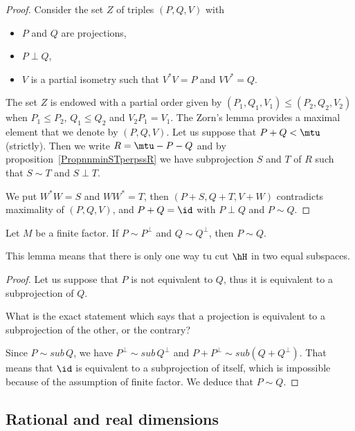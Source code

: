 \begin{proof}
Consider the set \( Z\) of triples \( (P,Q,V)\) with
\begin{itemize}
    \item \( P\) and \( Q\) are projections,
    \item \( P\perp Q\),
    \item
        \( V\) is a partial isometry such that \( V^*V=P\) and \( VV^*=Q\).
\end{itemize}
The set $Z$ is endowed with a partial order given by $(P_1,Q_1,V_1)\leq (P_2,Q_2,V_2)$ when $P_1\leq P_2$, $Q_1\leq Q_2$ and $V_2P_1=V_1$. The Zorn's lemma provides a maximal element that we denote by $(P,Q,V)$. Let us suppose that $P+Q<\mtu$ (strictly). Then we write $R=\mtu-P-Q$ and by proposition~\ref{PropnnminSTperpssR} we have subprojection $S$ and $T$ of $R$ such that $S\sim T$ and $S\perp T$.

We put $W^*W=S$ and $WW^*=T$, then $(P+S,Q+T,V+W)$ contradicts maximality of $(P,Q,V)$, and $P+Q=\id$ with $P\perp Q$ and $P\sim Q$.
\end{proof}

\begin{lemma}		\label{LemfinfacPPQQPsimQ}
Let $M$ be a finite factor. If $P\sim P^{\perp}$ and $Q\sim Q^{\perp}$, then $P\sim Q$.
\end{lemma}

This lemma means that there is only one way tu cut $\hH$ in two equal subspaces.

\begin{proof}
Let us suppose that $P$ is not equivalent to $Q$, thus it is equivalent to a subprojection of $Q$.

\begin{probleme}
What is the exact statement which says that a projection is equivalent to a subprojection of the other, or the contrary?
\end{probleme}

Since $P\sim sub\, Q$, we have $P^{\perp}\sim sub\, Q^{\perp}$ and $P+P^{\perp}\sim sub(Q+Q^{\perp})$. That means that $\id$ is equivalent to a subprojection of itself, which is impossible because of the assumption of finite factor. We deduce that $P\sim Q$.
\end{proof}

					\subsection{Rational and real dimensions}
\label{SubSecRationalRealDim}

